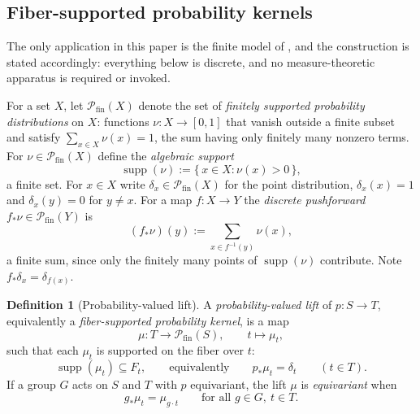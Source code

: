 \documentclass[11pt,reqno]{amsart}
\theoremstyle{plain}
\theoremstyle{definition}
\newtheorem{definition}[theorem]{Definition}
\theoremstyle{remark}
\begin{document}
\subsection{Fiber-supported probability kernels}

The only application in this paper is the finite model of , and the construction is stated accordingly: everything below is discrete, and no measure-theoretic apparatus is required or invoked.

For a set $X$, let $\mathcal{P}_{\mathrm{fin}}(X)$ denote the set of \emph{finitely supported probability distributions} on $X$: functions $\nu\colon X\to[0,1]$ that vanish outside a finite subset and satisfy $\sum_{x\in X}\nu(x)=1$, the sum having only finitely many nonzero terms. For $\nu\in\mathcal{P}_{\mathrm{fin}}(X)$ define the \emph{algebraic support}
\begin{equation}
\label{eq:algsupport}
\operatorname{supp}(\nu):=\{\,x\in X:\nu(x)>0\,\},
\end{equation}
a finite set. For $x\in X$ write $\delta_{x}\in\mathcal{P}_{\mathrm{fin}}(X)$ for the point distribution, $\delta_{x}(x)=1$ and $\delta_{x}(y)=0$ for $y\neq x$. For a map $f\colon X\to Y$ the \emph{discrete pushforward} $f_{\ast}\nu\in\mathcal{P}_{\mathrm{fin}}(Y)$ is
\begin{equation}
\label{eq:pushforward}
(f_{\ast}\nu)(y):=\sum_{x\in f^{-1}(y)}\nu(x),
\end{equation}
a finite sum, since only the finitely many points of $\operatorname{supp}(\nu)$ contribute. Note $f_{\ast}\delta_{x}=\delta_{f(x)}$.

\begin{definition}[Probability-valued lift]
\label{def:kernel}
A \emph{probability-valued lift} of $p\colon S\to T$, equivalently a \emph{fiber-supported probability kernel}, is a map
\begin{equation}
\label{eq:kernel}
\mu\colon T\longrightarrow\mathcal{P}_{\mathrm{fin}}(S),
\qquad
t\longmapsto\mu_{t},
\end{equation}
such that each $\mu_{t}$ is supported on the fiber over $t$:
\begin{equation}
\label{eq:kernelsupport}
\operatorname{supp}(\mu_{t})\subseteq F_{t},
\qquad\text{equivalently}\qquad
p_{\ast}\mu_{t}=\delta_{t}
\qquad (t\in T).
\end{equation}
If a group $G$ acts on $S$ and $T$ with $p$ equivariant, the lift $\mu$ is \emph{equivariant} when
\begin{equation}
\label{eq:kernelequiv}
g_{\ast}\mu_{t}=\mu_{g\cdot t}
\qquad\text{for all }g\in G,\ t\in T.
\end{equation}
\end{definition}
\end{document}
